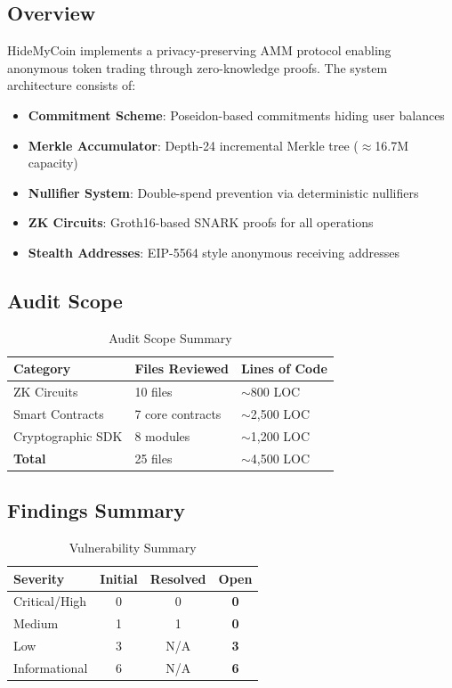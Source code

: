 \documentclass[11pt,a4paper]{article}
\begin{document}
\subsection{Overview}

HideMyCoin implements a privacy-preserving AMM protocol enabling anonymous token trading through zero-knowledge proofs. The system architecture consists of:

\begin{itemize}
    \item \textbf{Commitment Scheme}: Poseidon-based commitments hiding user balances
    \item \textbf{Merkle Accumulator}: Depth-24 incremental Merkle tree ($\approx$16.7M capacity)
    \item \textbf{Nullifier System}: Double-spend prevention via deterministic nullifiers
    \item \textbf{ZK Circuits}: Groth16-based SNARK proofs for all operations
    \item \textbf{Stealth Addresses}: EIP-5564 style anonymous receiving addresses
\end{itemize}

\subsection{Audit Scope}

\begin{table}[H]
\centering
\begin{tabular}{|l|l|l|}
\hline
\textbf{Category} & \textbf{Files Reviewed} & \textbf{Lines of Code} \\
\hline
ZK Circuits & 10 files & $\sim$800 LOC \\
Smart Contracts & 7 core contracts & $\sim$2,500 LOC \\
Cryptographic SDK & 8 modules & $\sim$1,200 LOC \\
\hline
\textbf{Total} & 25 files & $\sim$4,500 LOC \\
\hline
\end{tabular}
\caption{Audit Scope Summary}
\end{table}

\subsection{Findings Summary}

\begin{table}[H]
\centering
\begin{tabular}{|l|c|c|c|}
\hline
\textbf{Severity} & \textbf{Initial} & \textbf{Resolved} & \textbf{Open} \\
\hline
\textcolor{high}{Critical/High} & 0 & 0 & \textbf{0} \\
\textcolor{medium!80!black}{Medium} & 1 & 1 & \textbf{0} \\
\textcolor{low}{Low} & 3 & N/A & \textbf{3} \\
\textcolor{info}{Informational} & 6 & N/A & \textbf{6} \\
\hline
\end{tabular}
\caption{Vulnerability Summary}
\end{table}
\end{document}
